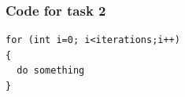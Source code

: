 \documentclass[a4paper,10pt]{article}
\begin{document}
\subsubsection*{Code for task 2}


\newpage
\begin{center}
\begin{minipage}[t]{85mm}
\begin{lstlisting}
for (int i=0; i<iterations;i++)
{
  do something
}
\end{lstlisting}
\end{minipage}
\end{center}

%
\end{document}
